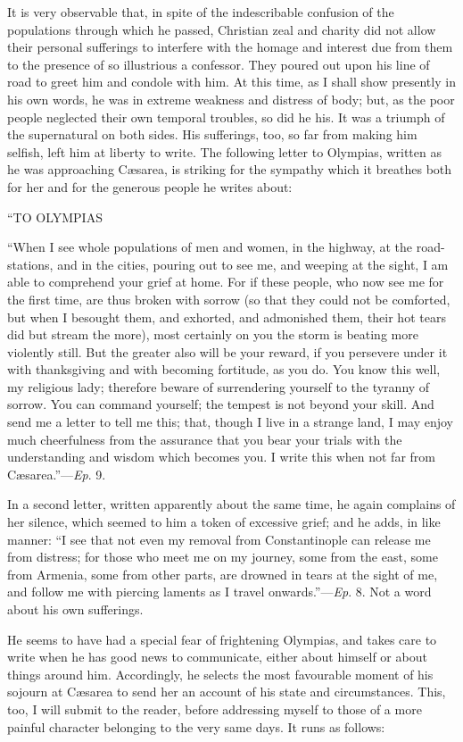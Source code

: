 It is very observable that, in spite of the indescribable confusion
of the populations through which he passed, Christian zeal and charity
did not allow their personal sufferings to interfere with the homage
and interest due from them to the presence of so illustrious a
confessor. They poured out upon his line of road to greet him and
condole with him. At this time, as I shall show presently in his own
words, he was in extreme weakness and distress of body; but, as the
poor people neglected their own temporal troubles, so did he his. It
was a triumph of the supernatural on both sides. His sufferings, too,
so far from making him selfish, left him at liberty to write. The
following letter to Olympias, written as he was approaching Cæsarea,
is striking for the sympathy which it breathes both for her and for
the generous people he writes about:

``TO
OLYMPIAS

``When I see whole populations of men and women, in the
highway, at the road-stations, and in the cities, pouring out to see
me, and weeping at the sight, I am able to comprehend your grief at
home. For if these people, who now see me for the first time, are thus
broken with sorrow (so that they could not be comforted, but when I
besought them, and exhorted, and admonished them, their hot tears did
but stream the more), most certainly on you the storm
is beating more violently still. But the greater also will be your
reward, if you persevere under it with thanksgiving and with becoming
fortitude, as you do. You know this well, my religious lady; therefore
beware of surrendering yourself to the tyranny of sorrow. You can
command yourself; the tempest is not beyond your skill. And send me a
letter to tell me this; that, though I live in a strange land, I may
enjoy much cheerfulness from the assurance that you bear your trials
with the understanding and wisdom which becomes you. I write this when
not far from Cæsarea.''—\emph{Ep}. 9.

In a second letter, written apparently about the same time, he
again complains of her silence, which seemed to him a token of
excessive grief; and he adds, in like manner: ``I see that not
even my removal from Constantinople can release me from distress; for
those who meet me on my journey, some from the east, some from
Armenia, some from other parts, are drowned in tears at the sight of
me, and follow me with piercing laments as I travel onwards.''—\emph{Ep}.
8. Not a word about his own sufferings.

He seems to have had a special fear of frightening Olympias, and
takes care to write when he has good news to communicate, either about
himself or about things around him. Accordingly, he selects the most
favourable moment of his sojourn at Cæsarea to send her an account of
his state and circumstances. This, too, I will submit to the reader,
before addressing myself to those of a more painful character
belonging to the very same days. It runs as follows:

